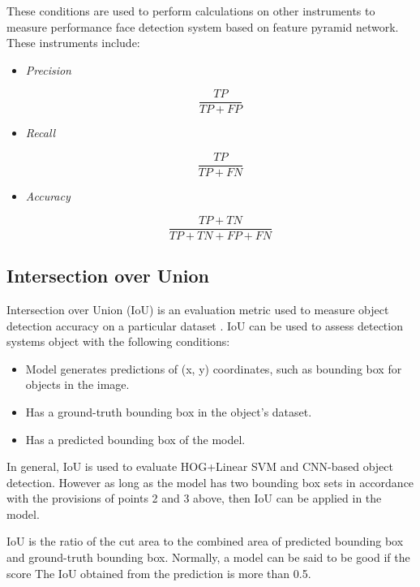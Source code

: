 These conditions are used to perform calculations on other instruments to measure performance
face detection system based on feature pyramid network. These instruments include:

\begin{itemize}
  \item \emph{Precision}
  
  \begin{equation}
    \frac{TP}{TP+FP} 
  \end{equation}
  
  \item \emph{Recall}
  
  \begin{equation}
    \frac{TP}{TP+FN}
  \end{equation}  

  \item \emph{Accuracy}
  
  \begin{equation}
    \frac{TP+TN}{TP+TN+FP+FN}
  \end{equation}  

\end{itemize}

\bigskip

\subsection{Intersection over Union}

Intersection over Union (IoU) is an evaluation metric used to measure
object detection accuracy on a particular dataset \citep{aghdam2017guide}. IoU can be used to assess detection systems
object with the following conditions:

\begin{itemize}
  \item Model generates predictions of (x, y) coordinates, such as bounding box for objects in the image.
  \item Has a ground-truth bounding box in the object's dataset.
  \item Has a predicted bounding box of the model.
\end{itemize}

In general, IoU is used to evaluate HOG+Linear SVM
and CNN-based object detection. However as long as the model has two bounding box sets
in accordance with the provisions of points 2 and
3 above, then IoU can be applied in the model.

IoU is the ratio of the cut area to
the combined area of predicted bounding box and ground-truth bounding box.
Normally, a model can be said to be good if the score
The IoU obtained from the prediction is more than 0.5.

